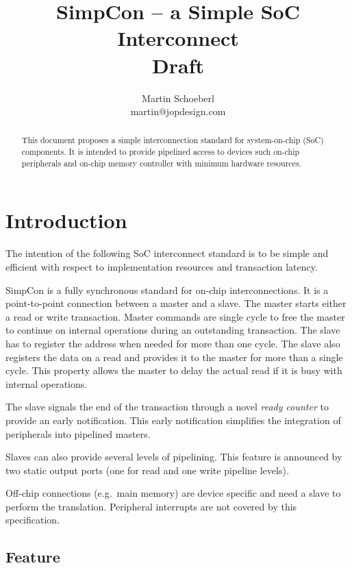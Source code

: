 \documentclass[a4paper,12pt]{scrartcl}
\begin{document}
\title{SimpCon -- a Simple SoC Interconnect\\Draft}
\author{Martin Schoeberl\\ martin@jopdesign.com}
\maketitle \thispagestyle{empty}

\begin{abstract}

This document proposes a simple interconnection standard for
system-on-chip (SoC) components. It is intended to provide pipelined
access to devices such on-chip peripherals and on-chip memory
controller with minimum hardware resources.


\end{abstract}

\section{Introduction}

The intention of the following SoC interconnect standard is to be
simple and efficient with respect to implementation resources and
transaction latency.

SimpCon is a fully synchronous standard for on-chip
interconnections. It is a point-to-point connection between a master
and a slave. The master starts either a read or write transaction.
Master commands are single cycle to free the master to continue on
internal operations during an outstanding transaction. The slave has
to register the address when needed for more than one cycle. The
slave also registers the data on a read and provides it to the
master for more than a single cycle. This property allows the master
to delay the actual read if it is busy with internal operations.

The slave signals the end of the transaction through a novel
\emph{ready counter} to provide an early notification. This early
notification simplifies the integration of peripherals into
pipelined masters.

Slaves can also provide several levels of pipelining. This feature
is announced by two static output ports (one for read and one write
pipeline levels).

Off-chip connections (e.g.\ main memory) are device specific and
need a slave to perform the translation. Peripheral interrupts are
not covered by this specification.

\subsection{Feature}
\end{document}
